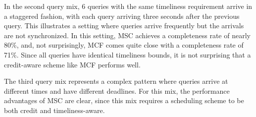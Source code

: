 In the second query mix, 6 queries with the same timeliness
requirement arrive in a staggered fashion, with each query arriving
three seconds after the previous query.
%
This illustrates a setting where queries arrive frequently but the
arrivals are not synchronized.
%
In this setting, MSC achieves a completeness rate of nearly 80\%, and,
not surprisingly, MCF comes quite close with a completeness rate of
71\%.
%
Since all queries have identical timeliness bounds, it is not
surprising that a credit-aware scheme like MCF performs well.
%

The third query mix represents a complex pattern where queries arrive
at different times and have different deadlines.
%
For this mix, the performance advantages of MSC are clear, since this
mix requires a scheduling scheme to be both credit and
timeliness-aware.




